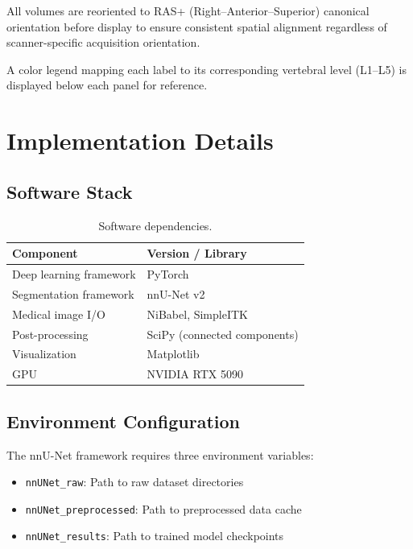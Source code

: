 \documentclass[12pt, a4paper]{article}
\begin{document}
All volumes are reoriented to RAS+ (Right--Anterior--Superior) canonical orientation before display to ensure consistent spatial alignment regardless of scanner-specific acquisition orientation.

A color legend mapping each label to its corresponding vertebral level (L1--L5) is displayed below each panel for reference.

\section{Implementation Details}

\subsection{Software Stack}

\begin{table}[H]
\centering
\caption{Software dependencies.}
\begin{tabular}{@{}ll@{}}
\toprule
\textbf{Component} & \textbf{Version / Library} \\
\midrule
Deep learning framework & PyTorch \\
Segmentation framework & nnU-Net v2 \\
Medical image I/O & NiBabel, SimpleITK \\
Post-processing & SciPy (connected components) \\
Visualization & Matplotlib \\
GPU & NVIDIA RTX 5090 \\
\bottomrule
\end{tabular}
\end{table}

\subsection{Environment Configuration}

The nnU-Net framework requires three environment variables:
\begin{itemize}[noitemsep]
    \item \texttt{nnUNet\_raw}: Path to raw dataset directories
    \item \texttt{nnUNet\_preprocessed}: Path to preprocessed data cache
    \item \texttt{nnUNet\_results}: Path to trained model checkpoints
\end{itemize}
\end{document}
